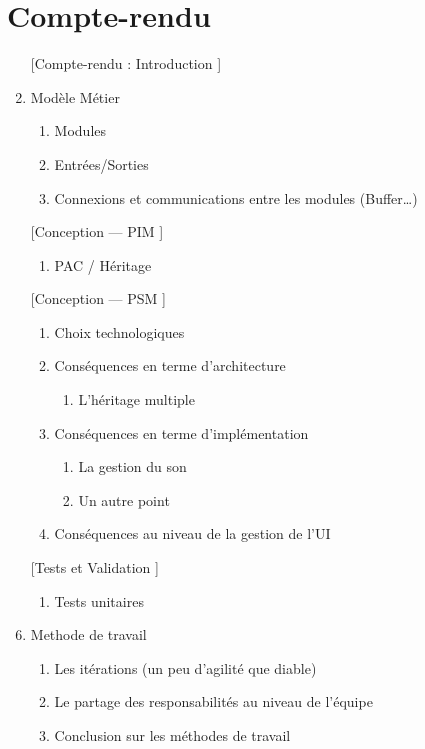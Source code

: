 \section{Compte-rendu}

\begin{enumerate}[1.]
\item
  [[Compte-rendu : Introduction]]
\item
  Modèle Métier
  \begin{enumerate}[1.]
  \item
    Modules
  \item
    Entrées/Sorties
  \item
    Connexions et communications entre les modules (Buffer\ldots{})
  \end{enumerate}
\item
  [[Conception — PIM]]
  \begin{enumerate}[1.]
  \item
    PAC / Héritage
  \end{enumerate}
\item
  [[Conception — PSM]]
  \begin{enumerate}[1.]
  \item
    Choix technologiques
  \item
    Conséquences en terme d'architecture
    \begin{enumerate}[1.]
    \item
      L'héritage multiple
    \end{enumerate}
  \item
    Conséquences en terme d'implémentation
    \begin{enumerate}[1.]
    \item
      La gestion du son
    \item
      Un autre point
    \end{enumerate}
  \item
    Conséquences au niveau de la gestion de l'UI
  \end{enumerate}
\item
  [[Tests et Validation]]
  \begin{enumerate}[1.]
  \item
    Tests unitaires
  \end{enumerate}
\item
  Methode de travail
  \begin{enumerate}[1.]
  \item
    Les itérations (un peu d'agilité que diable)
  \item
    Le partage des responsabilités au niveau de l'équipe
  \item
    Conclusion sur les méthodes de travail
  \end{enumerate}
\end{enumerate}

